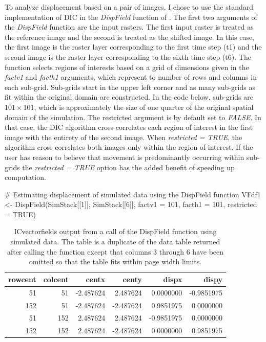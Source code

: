 To analyze displacement based on a pair of images, I chose to use the
standard implementation of DIC in the \emph{DispField} function of
. The first two arguments of the
\emph{DispField} function are the input rasters. The first input raster
is treated as the reference image and the second is treated as the
shifted image. In this case, the first image is the raster layer
corresponding to the first time step (t1) and the second image is the
raster layer corresponding to the sixth time step (t6). The function
selects regions of interests based on a grid of dimensions given in the
\emph{factv1} and \emph{facth1} arguments, which represent to number of
rows and columns in each sub-grid. Sub-grids start in the upper left
corner and as many sub-grids as fit within the original domain are
constructed. In the code below, sub-grids are \(101 \times 101\), which
is approximately the size of one quarter of the original spatial domain
of the simulation. The restricted argument is by default set to
\emph{FALSE}. In that case, the DIC algorithm cross-correlates each
region of interest in the first image with the entirety of the second
image. When \emph{restricted = TRUE}, the algorithm cross correlates
both images only within the region of interest. If the user has reason
to believe that movement is predominantly occurring within sub-grids the
\emph{restricted = TRUE} option has the added benefit of speeding up
computation.

\begin{Schunk}
\begin{Sinput}
# Estimating displacement of simulated data using the DispField function
VFdf1 <- DispField(SimStack[[1]], SimStack[[6]], factv1 = 101, facth1 = 101, 
                    restricted = TRUE)
\end{Sinput}
\end{Schunk}

\begin{Schunk}
\begin{table}

\caption{\label{tab:DispField-output-tex}ICvectorfields output from a call of the DispField function using simulated data. The table is a duplicate of the data table returned after calling the function except that columns 3 through 6 have been omitted so that the table fits within page width limits.}
\centering
\begin{tabular}[t]{r|r|r|r|r|r}
\hline
rowcent & colcent & centx & centy & dispx & dispy\\
\hline
51 & 51 & -2.487624 & 2.487624 & 0.0000000 & -0.9851975\\
\hline
152 & 51 & -2.487624 & -2.487624 & 0.9851975 & 0.0000000\\
\hline
51 & 152 & 2.487624 & 2.487624 & -0.9851975 & 0.0000000\\
\hline
152 & 152 & 2.487624 & -2.487624 & 0.0000000 & 0.9851975\\
\hline
\end{tabular}
\end{table}

\end{Schunk}

